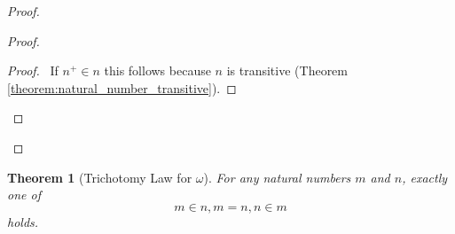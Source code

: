 \documentclass{article}
\let\qed\relax
\newtheorem{theorem}[axiom]{Theorem}
\theoremstyle{definition}
\begin{document}
    \begin{proof}
        \pf
        \begin{proof}
            \begin{proof}
                \pf\ If $n^+ \in n$ this follows because $n$ is transitive (Theorem \ref{theorem:natural_number_transitive}).
            \end{proof}
        \end{proof}
        \qed
    \end{proof}

    \begin{theorem}[Trichotomy Law for $\omega$]
        For any natural numbers $m$ and $n$, exactly one of
        \[ m \in n, m = n, n \in m \]
        holds.
    \end{theorem}
\end{document}
